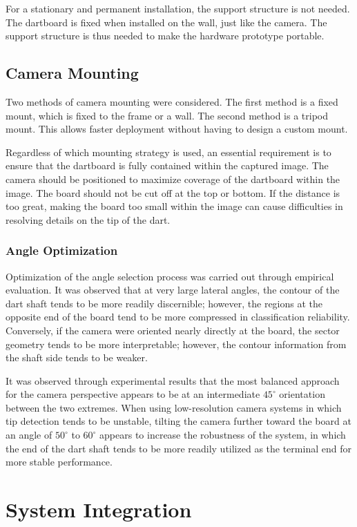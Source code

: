 For a stationary and permanent installation, the support structure is not needed. The dartboard is fixed when installed on the wall, just like the camera. The support structure is thus needed to make the hardware prototype portable.

\subsection{Camera Mounting}

Two methods of camera mounting were considered. The first method is a fixed mount, which is fixed to the frame or a wall. The second method is a tripod mount. This allows faster deployment without having to design a custom mount.

Regardless of which mounting strategy is used, an essential requirement is to ensure that the dartboard is fully contained within the captured image. The camera should be positioned to maximize coverage of the dartboard within the image. The board should not be cut off at the top or bottom. If the distance is too great, making the board too small within the image can cause difficulties in resolving details on the tip of the dart.

\subsubsection{Angle Optimization}
Optimization of the angle selection process was carried out through empirical evaluation. It was observed that at very large lateral angles, the contour of the dart shaft tends to be more readily discernible; however, the regions at the opposite end of the board tend to be more compressed in classification reliability. Conversely, if the camera were oriented nearly directly at the board, the sector geometry tends to be more interpretable; however, the contour information from the shaft side tends to be weaker.

It was observed through experimental results that the most balanced approach for the camera perspective appears to be at an intermediate $45^{\circ}$ orientation between the two extremes. When using low-resolution camera systems in which tip detection tends to be unstable, tilting the camera further toward the board at an angle of $50^{\circ}$ to $60^{\circ}$ appears to increase the robustness of the system, in which the end of the dart shaft tends to be more readily utilized as the terminal end for more stable performance.


\setauthor{\firstauthor}
\section{System Integration}

